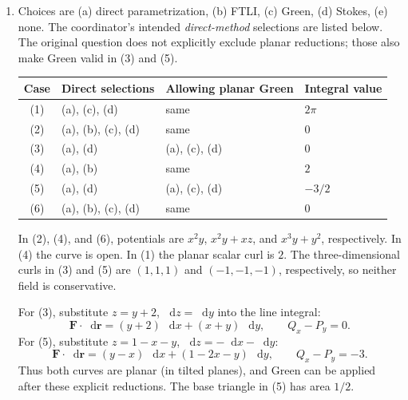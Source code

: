 \documentclass[11pt,letterpaper]{article}
\renewcommand{\vec}[1]{\mathbf{#1}}
\newcommand{\dd}{\mathop{}\!\mathrm{d}}
\begin{document}
\begin{enumerate}[start=36]
\item Choices are (a) direct parametrization, (b) FTLI, (c) Green,
(d) Stokes, (e) none. The coordinator's intended \emph{direct-method}
selections are listed below. The original question does not explicitly
exclude planar reductions; those also make Green valid in (3) and (5).
\begin{center}
\renewcommand{\arraystretch}{1.1}
\begin{tabular}{@{}clll@{}}
\toprule
Case&Direct selections&Allowing planar Green&Integral value\\
\midrule
(1)&(a), (c), (d)&same&$2\pi$\\
(2)&(a), (b), (c), (d)&same&$0$\\
(3)&(a), (d)&(a), (c), (d)&$0$\\
(4)&(a), (b)&same&$2$\\
(5)&(a), (d)&(a), (c), (d)&$-3/2$\\
(6)&(a), (b), (c), (d)&same&$0$\\
\bottomrule
\end{tabular}
\end{center}
In (2), (4), and (6), potentials are $x^2y$, $x^2y+xz$, and
$x^3y+y^2$, respectively. In (4) the curve is open. In (1) the planar
scalar curl is $2$. The three-dimensional curls in (3) and (5) are
$(1,1,1)$ and $(-1,-1,-1)$, respectively, so neither field is conservative.

For (3), substitute $z=y+2$, $\dd z=\dd y$ into the line integral:
\[
\vec F\cdot\dd\vec r=(y+2)\,\dd x+(x+y)\,\dd y,
\qquad Q_x-P_y=0.
\]
For (5), substitute $z=1-x-y$, $\dd z=-\dd x-\dd y$:
\[
\vec F\cdot\dd\vec r=(y-x)\,\dd x+(1-2x-y)\,\dd y,
\qquad Q_x-P_y=-3.
\]
Thus both curves are planar (in tilted planes), and Green can be applied
after these explicit reductions. The base triangle in (5) has area $1/2$.
\end{enumerate}
\end{document}
